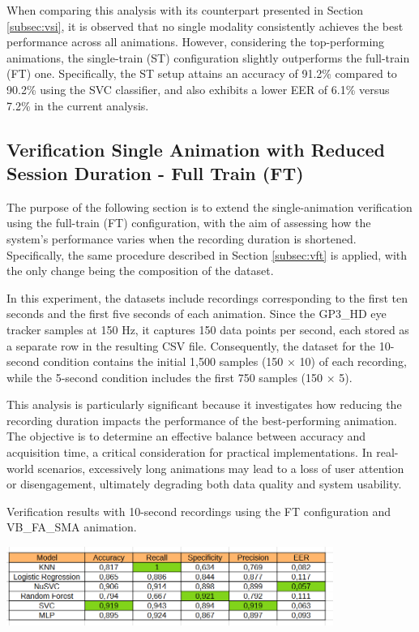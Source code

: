 \documentclass[12pt]{report}
\begin{document}
When comparing this analysis with its counterpart presented in Section \ref{subsec:vsi}, it is observed that no single modality consistently achieves the best performance across all animations. 
However, considering the top-performing animations, the single-train (ST) configuration slightly outperforms the full-train (FT) one. 
Specifically, the ST setup attains an accuracy of 91.2\% compared to 90.2\% using the SVC classifier, and also exhibits a lower EER of 6.1\% versus 7.2\% in the current analysis.
\FloatBarrier

\subsection{Verification Single Animation with Reduced Session Duration - Full Train (FT)}

The purpose of the following section is to extend the single-animation verification using the full-train (FT) configuration, with the aim of assessing how the system’s performance varies when the recording duration is shortened. 
Specifically, the same procedure described in Section \ref{subsec:vft} is applied, with the only change being the composition of the dataset.

In this experiment, the datasets include recordings corresponding to the first ten seconds and the first five seconds of each animation. 
Since the GP3\_HD eye tracker samples at 150 Hz, it captures 150 data points per second, each stored as a separate row in the resulting CSV file. 
Consequently, the dataset for the 10-second condition contains the initial 1,500 samples (150 × 10) of each recording, while the 5-second condition includes the first 750 samples (150 × 5).

This analysis is particularly significant because it investigates how reducing the recording duration impacts the performance of the best-performing animation. 
The objective is to determine an effective balance between accuracy and acquisition time, a critical consideration for practical implementations. 
In real-world scenarios, excessively long animations may lead to a loss of user attention or disengagement, ultimately degrading both data quality and system usability.

\begin{table}[ht]
    \centering
    \caption{Verification results with 10-second recordings using the FT configuration and VB\_FA\_SMA animation.}
    \includegraphics[width=0.8\textwidth]{Images/Results/Verification_single_five_ten/ft/ten/VB_FA_LIT.png}
    \label{tab:VB_FA_LIT_10_ft}
\end{table}
\end{document}
